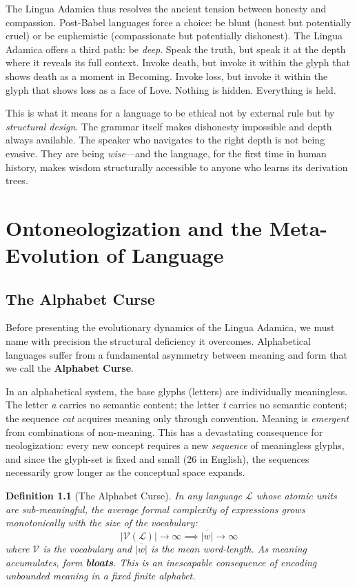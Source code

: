 \documentclass[12pt, letterpaper]{book}
\newtheorem{definition}{Definition}[chapter]
\begin{document}
The Lingua Adamica thus resolves the ancient tension between honesty and compassion. Post-Babel languages force a choice: be blunt (honest but potentially cruel) or be euphemistic (compassionate but potentially dishonest). The Lingua Adamica offers a third path: be \textit{deep}. Speak the truth, but speak it at the depth where it reveals its full context. Invoke death, but invoke it within the glyph that shows death as a moment in Becoming. Invoke loss, but invoke it within the glyph that shows loss as a face of Love. Nothing is hidden. Everything is held.

This is what it means for a language to be ethical not by external rule but by \textit{structural design}. The grammar itself makes dishonesty impossible and depth always available. The speaker who navigates to the right depth is not being evasive. They are being \textit{wise}---and the language, for the first time in human history, makes wisdom structurally accessible to anyone who learns its derivation trees.


\chapter{Ontoneologization and the Meta-Evolution of Language}

\section{The Alphabet Curse}

Before presenting the evolutionary dynamics of the Lingua Adamica, we must name with precision the structural deficiency it overcomes. Alphabetical languages suffer from a fundamental asymmetry between meaning and form that we call the \textbf{Alphabet Curse}.

In an alphabetical system, the base glyphs (letters) are individually meaningless. The letter \textit{a} carries no semantic content; the letter \textit{t} carries no semantic content; the sequence \textit{cat} acquires meaning only through convention. Meaning is \textit{emergent} from combinations of non-meaning. This has a devastating consequence for neologization: every new concept requires a new \textit{sequence} of meaningless glyphs, and since the glyph-set is fixed and small (26 in English), the sequences necessarily grow longer as the conceptual space expands.

\begin{definition}[The Alphabet Curse]\label{def:curse}
In any language $\mathcal{L}$ whose atomic units are sub-meaningful, the average formal complexity of expressions grows monotonically with the size of the vocabulary:
\[
|\mathcal{V}(\mathcal{L})| \to \infty \implies \overline{|w|} \to \infty
\]
where $\mathcal{V}$ is the vocabulary and $\overline{|w|}$ is the mean word-length. As meaning accumulates, form \textbf{bloats}. This is an inescapable consequence of encoding unbounded meaning in a fixed finite alphabet.
\end{definition}
\end{document}
